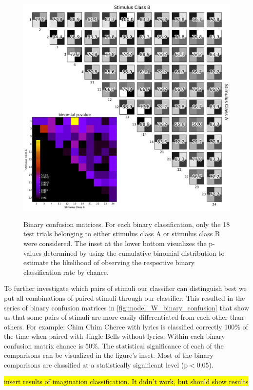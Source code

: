 \begin{figure}[h] 
  \begin{center}
    \includegraphics[width=.83\textwidth,keepaspectratio=true]{Figures/model_W_binary_confusion}
   \\\vspace{-0.8em}
    \caption{Binary confusion matrices.
    For each binary classification, only the 18 test trials belonging to either stimulus class A or stimulus class B were considered.
    The inset at the lower bottom visualizes the p-values determined by using the cumulative binomial distribution to estimate the likelihood of observing the respective binary classification rate by chance.}
    \label{fig:model_W_binary_confusion}
  \end{center}
  \vspace{-1em}
\end{figure}

To further investigate which pairs of stimuli our classifier can distinguish best we put all combinations of paired stimuli through our classifier.
This resulted in the series of binary confusion matrices in \autoref{fig:model_W_binary_confusion} that show us that some pairs of stimuli are more easily differentiated from each other than others. 
For example: Chim Chim Cheree with lyrics is classified correctly 100\% of the time when paired with Jingle Bells without lyrics. 
Within each binary confusion matrix chance is 50\%.
The statistical significance of each of the comparisons can be visualized in the figure's inset. 
Most of the binary comparisons are classified at a statistically significant level (p$<$0.05). 

\hl{insert results of imagination classification. It didn't work, but should show results}